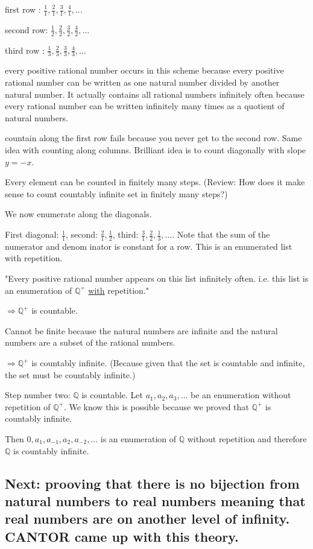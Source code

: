 \documentclass{article}
\begin{document}
first row   : $\frac{1}{1}, \frac{2}{1}, \frac{3}{1}, \frac{4}{1}, \dots$

second row: $\frac{1}{2}, \frac{2}{2}, \frac{3}{2}, \frac{4}{2}, \dots$

third row   : $\frac{1}{3}, \frac{2}{3}, \frac{3}{3}, \frac{4}{3}, \dots$

every positive rational number occurs in this scheme because every positive rational number can be written as one natural number divided by another natural number. It actually contains all rational numbers infinitely often because every rational number can be written infinitely many times as a quotient of natural numbers.

countain along the first row fails because you never get to the second row. Same idea with counting along columns. Brilliant idea is to count diagonally with slope $y = -x$.

Every element can be counted in finitely many steps. (Review: How does it make sense to count countably infinite set in finitely many steps?)

We now enumerate along the diagonals.

First diagonal: $\frac{1}{1}$, second: $\frac{2}{1}, \frac{1}{2}$, third: $\frac{3}{1}, \frac{2}{2}, \frac{1}{3}, \dots$. Note that the sum of the numerator and denom inator is constant for a row. This is an enumerated list with repetition.

"Every positive rational number appears on this list infinitely often. i.e. this list is an enumeration of $\mathbb{Q}^+$ \underline{with} repetition."

$\Rightarrow \mathbb{Q}^+$ is countable.

Cannot be finite because the natural numbers are infinite and the natural numbers are a subset of the rational numbers.

$\Rightarrow \mathbb{Q}^+$ is countably infinite. (Because given that the set is countable and infinite, the set must be countably infinite.)

Step number two: $\mathbb{Q}$ is countable. Let $a_1, a_2, a_3, \dots$ be an enumeration without repetition of $\mathbb{Q}^+$. We know this is possible because we proved that $\mathbb{Q}^+$ is countably infinite.

Then $0, a_1, a_{-1}, a_2, a_{-2}, \dots$ is an enumeration of $\mathbb{Q}$ without repetition and therefore $\mathbb{Q }$ is countably infinite.

\subsection{ Next: prooving that there is no bijection from natural numbers to real numbers meaning that real numbers are on another level of infinity. CANTOR came up with this theory.}
\end{document}
